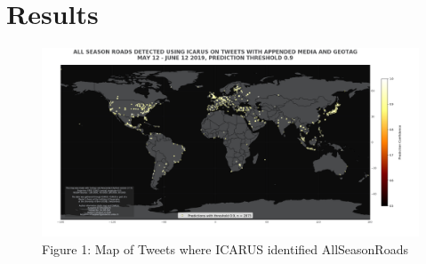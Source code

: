 \section{Results}
		\begin{figure}[h]
			\centering
			\includegraphics[scale=0.3]{images/map_ICARUS_thresh90}
			\caption{Figure 1: Map of Tweets where ICARUS identified AllSeasonRoads}
			\label{fig: 1}
		\end{figure}